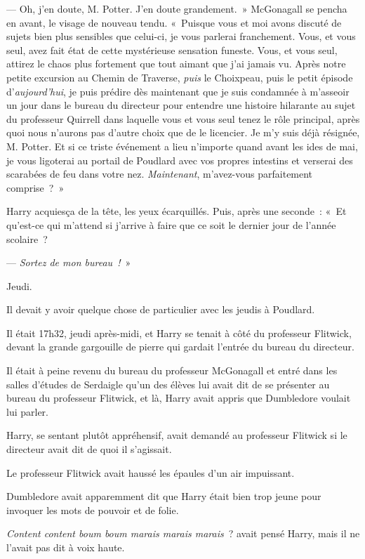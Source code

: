 --- Oh, j'en doute, M. Potter. J'en doute grandement.~»
McGonagall se pencha en avant, le visage de nouveau tendu.
«~Puisque vous et moi avons discuté de sujets bien plus sensibles que celui-ci, je vous parlerai franchement.
Vous, et vous seul, avez fait état de cette mystérieuse sensation funeste.
Vous, et vous seul, attirez le chaos plus fortement que tout aimant que j'ai jamais vu.
Après notre petite excursion au Chemin de Traverse, \emph{puis} le Choixpeau, puis le petit épisode d'\emph{aujourd'hui}, je puis prédire dès maintenant que je suis condamnée à m'asseoir un jour dans le bureau du directeur pour entendre une histoire hilarante au sujet du professeur Quirrell dans laquelle vous et vous seul tenez le rôle principal, après quoi nous n'aurons pas d'autre choix que de le licencier.
Je m'y suis déjà résignée, M. Potter.
Et si ce triste événement a lieu n'importe quand avant les ides de mai, je vous ligoterai au portail de Poudlard avec vos propres intestins et verserai des scarabées de feu dans votre nez.
\emph{Maintenant}, m'avez-vous parfaitement comprise~?~»

Harry acquiesça de la tête, les yeux écarquillés.
Puis, après une seconde~:
«~Et qu'est-ce qui m'attend si j'arrive à faire que ce soit le dernier jour de l'année scolaire~?

--- \emph{Sortez de mon bureau~!}~»

\later

Jeudi.

Il devait y avoir quelque chose de particulier avec les jeudis à Poudlard.

Il était 17h32, jeudi après-midi, et Harry se tenait à côté du professeur Flitwick, devant la grande gargouille de pierre qui gardait l'entrée du bureau du directeur.

Il était à peine revenu du bureau du professeur McGonagall et entré dans les salles d'études de Serdaigle qu'un des élèves lui avait dit de se présenter au bureau du professeur Flitwick, et là, Harry avait appris que Dumbledore voulait lui parler.

Harry, se sentant plutôt appréhensif, avait demandé au professeur Flitwick si le directeur avait dit de quoi il s'agissait.

Le professeur Flitwick avait haussé les épaules d'un air impuissant.

Dumbledore avait apparemment dit que Harry était bien trop jeune pour invoquer les mots de pouvoir et de folie.

\emph{Content content boum boum marais marais marais}~? avait pensé Harry, mais il ne l'avait pas dit à voix haute.

